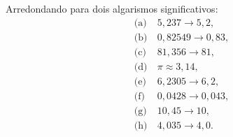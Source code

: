 Arredondando para dois algarismos significativos:
\begin{align*}
\text{(a)}
&\ 5{,}237 \to 5{,}2,\\
\text{(b)}
&\ 0{,}82549 \to 0{,}83,\\
\text{(c)}
&\ 81{,}356 \to 81,\\
\text{(d)}
&\ \pi \approx 3{,}14,\\
\text{(e)}
&\ 6{,}2305 \to 6{,}2,\\
\text{(f)}
&\ 0{,}0428 \to 0{,}043,\\
\text{(g)}
&\ 10{,}45 \to 10,\\
\text{(h)}
&\ 4{,}035 \to 4{,}0.
\end{align*}